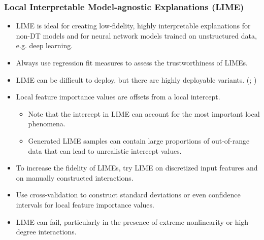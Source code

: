\documentclass[11pt,
               aspectratio=169
               ]{beamer}
\begin{document}
		\begin{frame}
		
			\frametitle{Local Interpretable Model-agnostic Explanations (LIME)}
			
			\begin{itemize}
			
				\item LIME is ideal for creating low-fidelity, highly interpretable explanations for non-DT models and for neural network models trained on unstructured data, e.g. deep learning.
			
				\item Always use regression fit measures to assess the trustworthiness of LIMEs.
			
				\item LIME can be difficult to deploy, but there are highly deployable variants. (\cite{lime-sup}; \cite{h2o_mli_booklet})
			
				\item Local feature importance values are offsets from a local intercept.
				
				\begin{itemize}
					
					\item Note that the intercept in LIME can account for the most important local phenomena.
					
					\item Generated LIME samples can contain large proportions of out-of-range data that can lead to unrealistic intercept values. 
					 
				\end{itemize}
			
			\end{itemize}
			
		\end{frame}
	
		\begin{frame}[t]
		
			\begin{itemize}
		
				\item To increase the fidelity of LIMEs, try LIME on discretized input features and on manually constructed interactions.

				\item Use cross-validation to construct standard deviations or even confidence intervals for local feature importance values.

				\item LIME can fail, particularly in the presence of extreme nonlinearity or high-degree interactions.
		
			\end{itemize}
		
		\end{frame}
\end{document}
